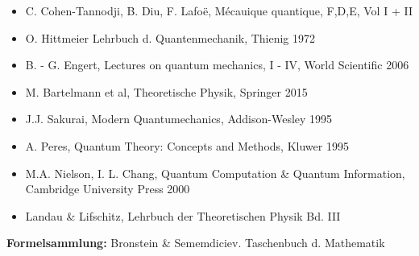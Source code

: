 \begin{itemize}
	\item C. Cohen-Tannodji, B. Diu, F. Lafo\"e, M\'ecauique quantique, F,D,E, Vol I + II
	\item O. Hittmeier Lehrbuch d. Quantenmechanik, Thienig 1972
	\item B. - G. Engert, Lectures on quantum mechanics, I - IV, World Scientific 2006
	\item M. Bartelmann et al, Theoretische Physik, Springer 2015
	\item J.J. Sakurai, Modern Quantumechanics, Addison-Wesley 1995
	\item A. Peres, Quantum Theory: Concepts and Methods, Kluwer 1995
	\item M.A. Nielson, I. L. Chang, Quantum Computation \& Quantum Information, Cambridge University Press 2000
	\item Landau \& Lifschitz, Lehrbuch der Theoretischen Physik Bd. III
\end{itemize}

\noindent
\textbf{Formelsammlung:} Bronstein \& Sememdiciev. Taschenbuch d. Mathematik